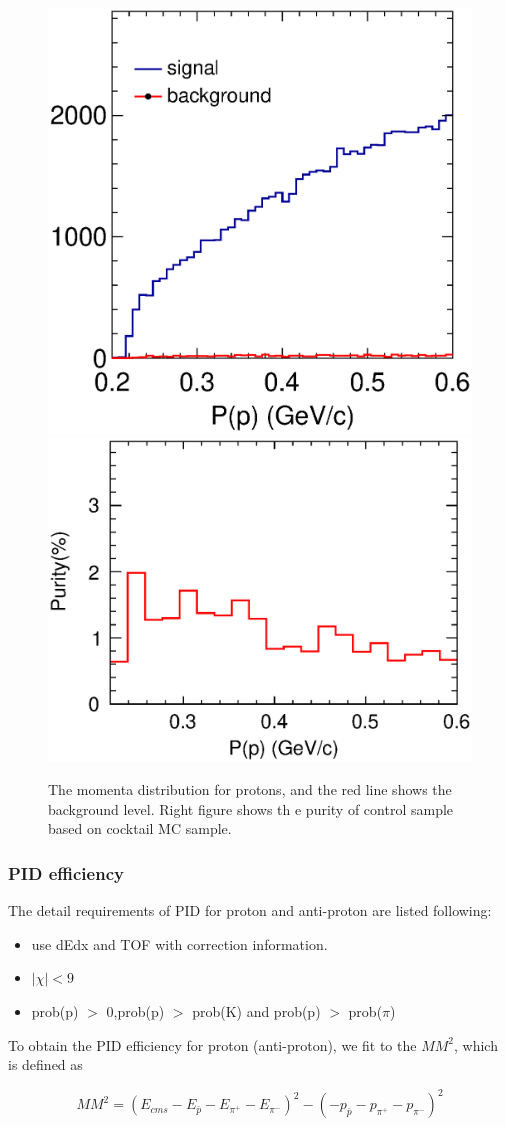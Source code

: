 \begin{figure}[htbp]
    \centering
    \includegraphics[width = 5 cm]{section/append/fig/momenta_pr_qqmc.eps}
    \includegraphics[width = 5 cm]{section/append/fig/Purity_pr_qqmc.eps}
    \caption{The momenta distribution for protons, and the red line
        shows the background level. Right figure shows th e purity of
    control sample based on cocktail MC sample.} 
    \label{Fig: bkg level for proton}
\end{figure}        

\subsubsection{PID efficiency}
The detail requirements of PID for proton and anti-proton are listed
following: 
\begin{itemize}
    \item use dEdx and TOF with correction information.
    \item $|\chi| < 9 $
    \item prob(p) $>$ 0,prob(p) $>$ prob(K) and prob(p) $>$ prob($\pi$)
\end{itemize}

To obtain the PID efficiency for proton (anti-proton), we fit to the
$MM^{2}$, which is defined as

\begin{equation} 
    MM^{2} = \left( E_{cms} - E_{\bar{p}} - E_{\pi^{+}} -
    E_{\pi^{-}} \right)^{2} - \left( - p_{\bar{p}} - p_{\pi^{+}} -
    p_{\pi^{-}} \right)^{2}
\end{equation}

